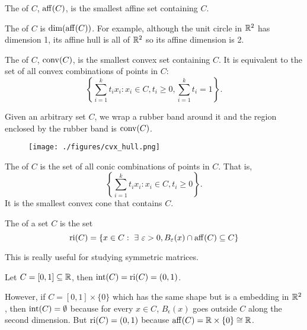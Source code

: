 \documentclass[class=article,crop=false]{standalone}
\begin{document}
\begin{defn}
	 The  of $ C$,  $ \operatorname{aff}(C)$, is the smallest affine set containing  $ C$.\end{defn}
	 The  of $ C$ is  $ \dim(\operatorname{aff} (C))$. For example, although the unit circle in $ \mathbb{R}^{2}$ has dimension 1, its affine hull is all of $ \mathbb{R}^2$ so its affine dimension is 2.

\begin{defn}
	The  of $ C$,  $ \operatorname{conv}(C)$, is the smallest convex set containing  $ C$. It is equivalent to the set of all convex combinations of points in $ C$:
	 \[
	 \left\{\sum_{ i= 1}^{ k} t_i x_i: x_i \in C, t_i \geq 0, \sum_{ i= 1}^{ k} t_i = 1 \right\} 
	 .\] 

\end{defn}
\begin{intuition}
	Given an arbitrary set $ C$, we wrap a rubber band around it and the region enclosed by the rubber band is $ \operatorname{conv}(C)$.
\end{intuition}
\begin{figure}[H]
	\centering
	\texttt{[image: ./figures/cvx\_hull.png]}
\end{figure}

\begin{defn}
The  of $ C$ is the set of all conic combinations of points in  $ C$. That is,
	 \[
	 \left\{\sum_{ i= 1}^{ k} t_i x_i: x_i \in C, t_i \geq 0 \right\} 
	 .\]
	 It is the smallest convex cone that contains $ C$.
\end{defn}
\begin{defn}
	The  of a set $ C$ is the set
	\[ \ri(C) = \{x \in C: \ \exists \ \epsilon>0 , B_{ \epsilon} ( x ) \cap \aff(C) \subseteq C\} \]
\end{defn}

\begin{note}
This is really useful for studying symmetric matrices. 
\end{note}

\begin{eg}
	Let $ C = [0,1] \subseteq \mathbb{R}$, then $ \operatorname{int} (C) = \operatorname{ri}(C) = (0,1)$.

	However, if $ C = [0,1] \times \{0\} $ which has the same shape but is a embedding in $ \mathbb{R}^2$, then $ \operatorname{int} (C) = \emptyset$ because for every $ x \in C$, $ B_{ \epsilon} ( x )$ goes outside $ C$ along the second dimension. But $ \operatorname{ri} (C) = (0,1)$ because  $ \operatorname{aff}(C) = \mathbb{R} \times \{0\} \cong \mathbb{R} $.
\end{eg}
\end{document}

